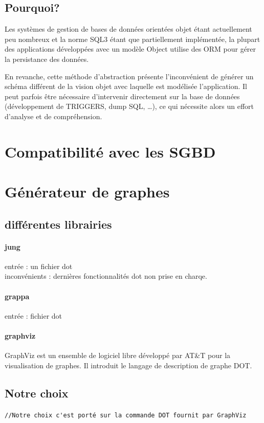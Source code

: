 	\subsection{Pourquoi?}
    Les systèmes de gestion de bases de données orientées objet étant actuellement peu nombreux et la norme SQL3 étant que partiellement implémentée, la plupart des applications développées avec un modèle Object utilise des ORM pour gérer la persistance des données.
    
En revanche, cette méthode d'abstraction présente l'inconvénient de générer un schéma différent de la vision objet avec laquelle est modélisée l'application. Il peut parfois être nécessaire d'intervenir directement sur la base de données (développement de TRIGGERS, dump SQL, \ldots), ce qui nécessite alors un effort d'analyse et de compréhension.

\section{Compatibilité avec les SGBD}

\section{Générateur de graphes}
  \subsection{différentes librairies}
		\paragraph{jung}
				entrée : un fichier dot\\
				inconvénients : dernières fonctionnalités dot non prise en charqe.
		\paragraph{grappa}
				 entrée : fichier dot
		\paragraph{graphviz}
			GraphViz est un ensemble de logiciel libre développé par AT\&T pour la visualisation de graphes. Il introduit le langage de description de graphe DOT.
				
  \subsection{Notre choix}
		\verb+//Notre choix c'est porté sur la commande DOT fournit par GraphViz+

